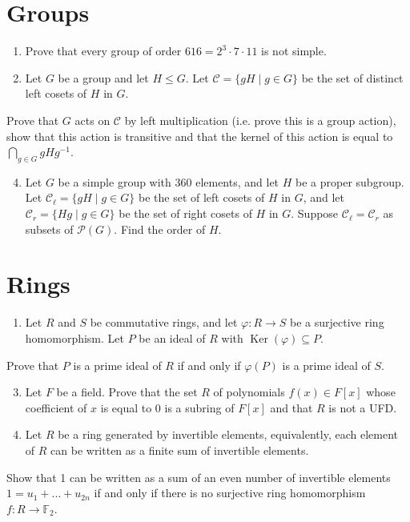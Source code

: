 \documentclass[10pt]{article}
\begin{document}
\section{Groups}
\begin{enumerate}
  \item Prove that every group of order $616=2^{3} \cdot 7 \cdot 11$ is not simple.

  \item Let $G$ be a group and let $H \leq G$. Let $\mathcal{C}=\{g H \mid g \in G\}$ be the set of distinct left cosets of $H$ in $G$.

\end{enumerate}
Prove that $G$ acts on $\mathcal{C}$ by left multiplication (i.e. prove this is a group action), show that this action is transitive and that the kernel of this action is equal to $\bigcap_{g \in G} g H g^{-1}$.

\begin{enumerate}
  \setcounter{enumi}{3}
  \item Let $G$ be a simple group with 360 elements, and let $H$ be a proper subgroup. Let $\mathcal{C}_{\ell}=\{g H \mid g \in G\}$ be the set of left cosets of $H$ in $G$, and let $\mathcal{C}_{r}=\{H g \mid g \in G\}$ be the set of right cosets of $H$ in $G$. Suppose $\mathcal{C}_{\ell}=\mathcal{C}_{r}$ as subsets of $\mathcal{P}(G)$. Find the order of $H$.
\end{enumerate}
\section{Rings}
\begin{enumerate}
  \item Let $R$ and $S$ be commutative rings, and let $\varphi: R \rightarrow S$ be a surjective ring homomorphism. Let $P$ be an ideal of $R$ with $\operatorname{Ker}(\varphi) \subseteq P$.
\end{enumerate}
Prove that $P$ is a prime ideal of $R$ if and only if $\varphi(P)$ is a prime ideal of $S$.

\begin{enumerate}
  \setcounter{enumi}{2}
  \item Let $F$ be a field. Prove that the set $R$ of polynomials $f(x) \in F[x]$ whose coefficient of $x$ is equal to 0 is a subring of $F[x]$ and that $R$ is not a UFD.

  \item Let $R$ be a ring generated by invertible elements, equivalently, each element of $R$ can be written as a finite sum of invertible elements.

\end{enumerate}
Show that 1 can be written as a sum of an even number of invertible elements $1=u_{1}+\ldots+u_{2 n}$ if and only if there is no surjective ring homomorphism $f: R \rightarrow \mathbb{F}_{2}$.
\end{document}
